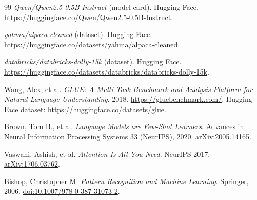 \documentclass[11pt]{article}
\begin{document}
\begin{thebibliography}{99}
\emph{Qwen/Qwen2.5-0.5B-Instruct} (model card). Hugging Face. \href{https://huggingface.co/Qwen/Qwen2.5-0.5B-Instruct}{https://huggingface.co/Qwen/Qwen2.5-0.5B-Instruct}.

\emph{yahma/alpaca-cleaned} (dataset). Hugging Face. \href{https://huggingface.co/datasets/yahma/alpaca-cleaned}{https://huggingface.co/datasets/yahma/alpaca-cleaned}.

\emph{databricks/databricks-dolly-15k} (dataset). Hugging Face. \href{https://huggingface.co/datasets/databricks/databricks-dolly-15k}{https://huggingface.co/datasets/databricks/databricks-dolly-15k}.

Wang, Alex, et al. \emph{GLUE: A Multi-Task Benchmark and Analysis Platform for Natural Language Understanding}. 2018. \href{https://gluebenchmark.com/}{https://gluebenchmark.com/}. Hugging Face dataset: \href{https://huggingface.co/datasets/glue}{https://huggingface.co/datasets/glue}.

Brown, Tom B., et al. \emph{Language Models are Few-Shot Learners}. Advances in Neural Information Processing Systems 33 (NeurIPS), 2020. \href{https://arxiv.org/abs/2005.14165}{arXiv:2005.14165}.

Vaswani, Ashish, et al. \emph{Attention Is All You Need}. NeurIPS 2017. \href{https://arxiv.org/abs/1706.03762}{arXiv:1706.03762}.

Bishop, Christopher M. \emph{Pattern Recognition and Machine Learning}. Springer, 2006. \href{https://doi.org/10.1007/978-0-387-31073-2}{doi:10.1007/978-0-387-31073-2}.

\end{thebibliography}
\end{document}
